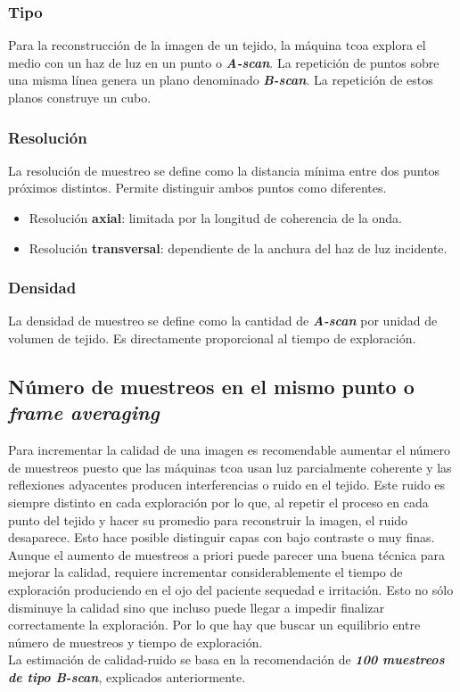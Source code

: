 \subsubsection{Tipo}
Para la reconstrucción de la imagen de un tejido, la máquina
\gls{tcoa} explora el medio con un haz de luz en un punto o
\emph{\textbf{A-scan}}. La repetición de puntos sobre una misma línea
genera un plano denominado \emph{\textbf{B-scan}}. La repetición de
estos planos construye un cubo.
\subsubsection{Resolución}
La resolución de muestreo se define como la distancia mínima entre dos
puntos próximos distintos. Permite distinguir ambos puntos como
diferentes.
\begin{itemize}
\item Resolución \textbf{axial}: limitada por la longitud de
  coherencia de la onda.
\item Resolución \textbf{transversal}: dependiente de la anchura del
  haz de luz incidente.
\end{itemize}
\subsubsection{Densidad}
La densidad de muestreo se define como la cantidad de
\emph{\textbf{A-scan}} por unidad de volumen de tejido. Es
directamente proporcional al tiempo de exploración.

\subsection{Número de muestreos en el mismo punto o \emph{frame
    averaging}}
Para incrementar la calidad de una imagen es recomendable aumentar el
número de muestreos puesto que las máquinas \gls{tcoa} usan luz
parcialmente coherente y las reflexiones
adyacentes producen interferencias o ruido en el tejido. Este ruido es
siempre distinto en cada exploración por lo que, al repetir el proceso
en cada punto del tejido y hacer su promedio para reconstruir la imagen, el
ruido desaparece. Esto hace posible distinguir capas con bajo contraste o
muy finas.\\
Aunque el aumento de muestreos a priori puede parecer una buena
técnica para mejorar la calidad, requiere incrementar
considerablemente el tiempo de exploración produciendo en el ojo del
paciente sequedad e irritación. Esto no sólo disminuye la calidad sino
que incluso puede llegar a impedir finalizar correctamente la
exploración. Por lo que hay que buscar un equilibrio entre número de
muestreos y tiempo de exploración.\\
La estimación de calidad-ruido se basa en la recomendación de
\emph{\textbf{100 muestreos de tipo B-scan}}, explicados anteriormente.

